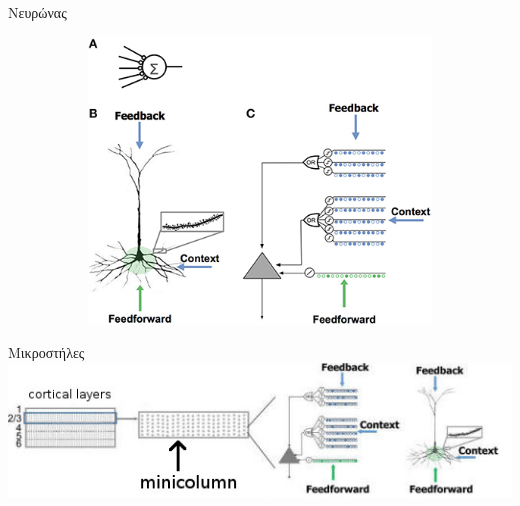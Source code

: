 \documentclass[10pt,lualatex]{beamer}
\begin{document}
\begin{frame}{Νευρώνας}
  \centering
	\begin{figure}[h]
		\begin{subfigure}{0.30\textwidth}
			
		\end{subfigure}
		\hfill
		\begin{subfigure}{0.65\textwidth}
			\includegraphics[width=\textwidth]{../figures/numenta_neuron}
		\end{subfigure}
	\end{figure}
\end{frame}

\begin{frame}{Μικροστήλες}
  \centering
  \includegraphics[width=.85\textwidth]{../figures/layer-minicolumn}
\end{frame}
\end{document}
